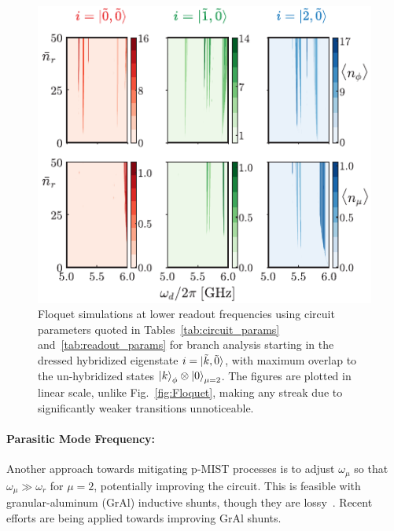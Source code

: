 \documentclass[%
reprint,
superscriptaddress,
 amsmath,amssymb,
 aps,
 prx,
longbibliography,
floatfix,
]{revtex4-2}
\newcommand{\singh}[1]{{\color{orange}{{}#1}}}%
\begin{document}
\begin{figure}[htb]
    \centering
    \includegraphics[width=\linewidth]{Figures/Floquet_low.pdf}
    \caption{Floquet simulations at lower readout frequencies using circuit parameters quoted in Tables~\ref{tab:circuit_params} and~\ref{tab:readout_params} for branch analysis starting in the dressed hybridized eigenstate $i=\ket{\tilde{k},\tilde{0}}$, with maximum overlap to the un-hybridized states $\ket{k}_\phi\otimes\ket{0}_{\mu=2}$. The figures are plotted in linear scale, unlike Fig.~\ref{fig:Floquet}, making any streak due to significantly weaker transitions \singh{($\Delta_{ac}<1 \ \mathrm{KHz}$)} unnoticeable.}
    \label{fig:Flo_low}
\end{figure}

\paragraph{Parasitic Mode Frequency:}
Another approach towards mitigating p-MIST processes is to adjust $\omega_\mu$ so that $\omega_\mu \gg\omega_r$ for $\mu=2$, potentially improving the circuit. This is feasible with granular-aluminum (GrAl) inductive shunts, though they are lossy~\cite{gusenkova2021quantum}. Recent efforts are being applied towards improving GrAl shunts. 
\end{document}
